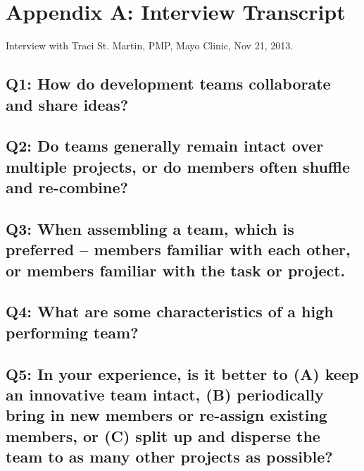 \clearpage

\section*{Appendix A: Interview Transcript}
Interview with Traci St. Martin, PMP\textregistered, Mayo Clinic, Nov 21, 2013.

\subsection*{Q1: How do development teams collaborate and share ideas?}



\subsection*{Q2: Do teams generally remain intact over multiple projects, or do members often shuffle and re-combine?}



\subsection*{Q3: When assembling a team, which is preferred -- members familiar with each other, or members familiar with the task or project.}



\subsection*{Q4: What are some characteristics of a high performing team?}



\subsection*{Q5: In your experience, is it better to (A) keep an innovative team intact, (B) periodically bring in new members or re-assign existing members, or (C) split up and disperse the team to as many other projects as possible?}